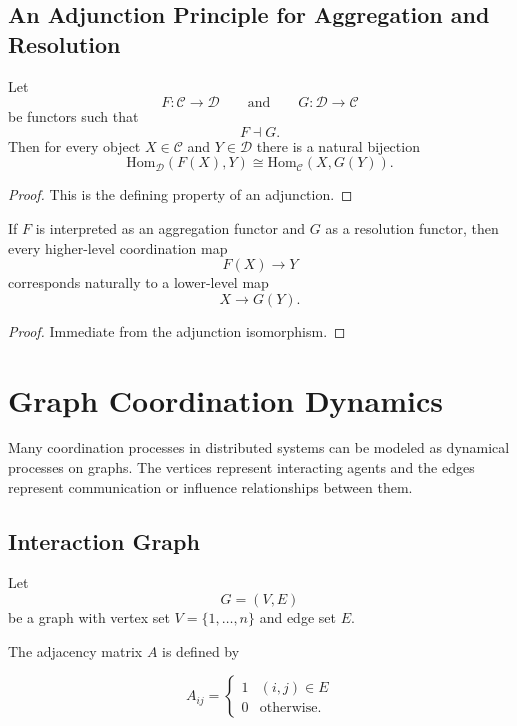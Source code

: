 \documentclass[12pt]{article}
\begin{document}
\subsection{An Adjunction Principle for Aggregation and Resolution}

\begin{theorem}
Let
\[
F : \mathcal{C} \rightarrow \mathcal{D}
\qquad\text{and}\qquad
G : \mathcal{D} \rightarrow \mathcal{C}
\]
be functors such that
\[
F \dashv G .
\]
Then for every object $X \in \mathcal{C}$ and $Y \in \mathcal{D}$ there is a natural bijection
\[
\mathrm{Hom}_{\mathcal{D}}(F(X),Y)
\cong
\mathrm{Hom}_{\mathcal{C}}(X,G(Y)).
\]
\end{theorem}

\begin{proof}
This is the defining property of an adjunction.
\end{proof}

\begin{corollary}
If $F$ is interpreted as an aggregation functor and $G$ as a resolution functor, then every higher-level coordination map
\[
F(X) \rightarrow Y
\]
corresponds naturally to a lower-level map
\[
X \rightarrow G(Y).
\]
\end{corollary}

\begin{proof}
Immediate from the adjunction isomorphism.
\end{proof}

\section{Graph Coordination Dynamics}

Many coordination processes in distributed systems can be modeled as dynamical processes on graphs. The vertices represent interacting agents and the edges represent communication or influence relationships between them.

\subsection{Interaction Graph}

Let
\[
G = (V,E)
\]
be a graph with vertex set $V=\{1,\dots,n\}$ and edge set $E$.

The adjacency matrix $A$ is defined by

\[
A_{ij} =
\begin{cases}
1 & (i,j) \in E \\
0 & \text{otherwise}.
\end{cases}
\]
\end{document}
